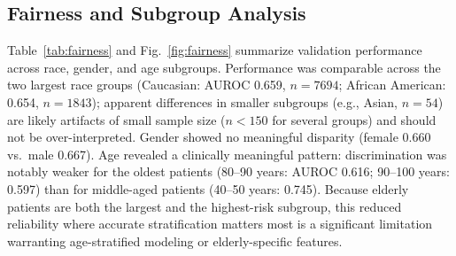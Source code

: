 \documentclass[12pt,onecolumn,journal]{IEEEtran}
\begin{document}
\subsection{Fairness and Subgroup Analysis}
Table~\ref{tab:fairness} and Fig.~\ref{fig:fairness} summarize validation performance across race, gender, and age subgroups. Performance was comparable across the two largest race groups (Caucasian: AUROC 0.659, $n=7694$; African American: 0.654, $n=1843$); apparent differences in smaller subgroups (e.g., Asian, $n=54$) are likely artifacts of small sample size ($n<150$ for several groups) and should not be over-interpreted. Gender showed no meaningful disparity (female 0.660 vs.\ male 0.667). Age revealed a clinically meaningful pattern: discrimination was notably weaker for the oldest patients (80--90 years: AUROC 0.616; 90--100 years: 0.597) than for middle-aged patients (40--50 years: 0.745). Because elderly patients are both the largest and the highest-risk subgroup, this reduced reliability where accurate stratification matters most is a significant limitation warranting age-stratified modeling or elderly-specific features.
\end{document}
